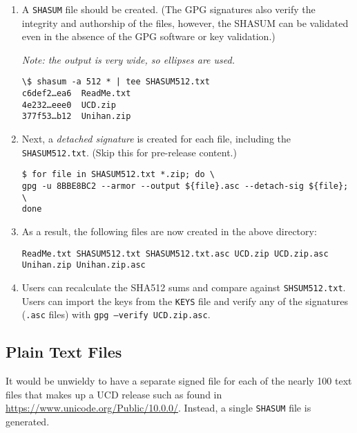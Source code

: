 \documentclass[12pt]{article}
\begin{document}
\begin{enumerate}

\item A {\tt SHASUM} file should be created. (The GPG signatures also verify the integrity and authorship of the files, however, the SHASUM can be validated even in the absence of the GPG software or key validation.)

\emph{Note: the output is very wide, so ellipses are used.}
\begin{verbatim}
\$ shasum -a 512 * | tee SHASUM512.txt
c6def2…ea6  ReadMe.txt
4e232…eee0  UCD.zip
377f53…b12  Unihan.zip
\end{verbatim}

\item Next, a \emph{detached signature} is created for each file, including the {\tt SHASUM512.txt}. (Skip this for pre-release content.)

\begin{verbatim}
$ for file in SHASUM512.txt *.zip; do \
gpg -u 8BBE8BC2 --armor --output ${file}.asc --detach-sig ${file}; \
done
\end{verbatim}

\item As a result, the following files are now created in the above directory:

{\tt ReadMe.txt SHASUM512.txt SHASUM512.txt.asc UCD.zip UCD.zip.asc Unihan.zip Unihan.zip.asc}

\item Users can recalculate the SHA512 sums and compare against {\tt SHSUM512.txt}. Users can import the keys from the {\tt KEYS} file and verify any of the signatures ({\tt .asc} files) with {\tt gpg --verify UCD.zip.asc}.

\end{enumerate}

\subsection{Plain Text Files}

It would be unwieldy to have a separate signed file for each of the nearly 100 text files that makes up a UCD release such as found in \url{https://www.unicode.org/Public/10.0.0/}.  Instead, a single {\tt SHASUM} file is generated.
\end{document}
